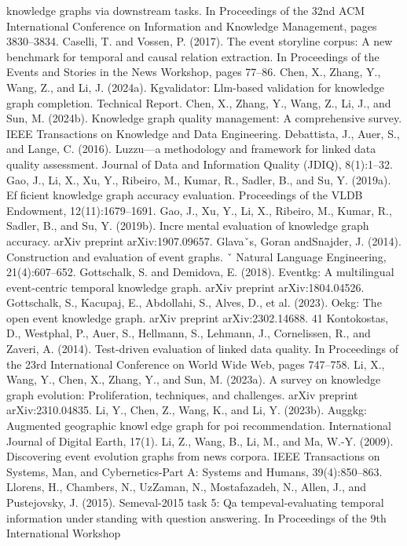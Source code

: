 knowledge graphs via downstream tasks. In Proceedings of the 32nd ACM International
Conference on Information and Knowledge Management, pages 3830–3834.
Caselli, T. and Vossen, P. (2017). The event storyline corpus: A new benchmark for
temporal and causal relation extraction. In Proceedings of the Events and Stories in
the News Workshop, pages 77–86.
Chen, X., Zhang, Y., Wang, Z., and Li, J. (2024a). Kgvalidator: Llm-based validation
for knowledge graph completion. Technical Report.
Chen, X., Zhang, Y., Wang, Z., Li, J., and Sun, M. (2024b). Knowledge graph quality
management: A comprehensive survey. IEEE Transactions on Knowledge and Data
Engineering.
Debattista, J., Auer, S., and Lange, C. (2016). Luzzu—a methodology and framework
for linked data quality assessment. Journal of Data and Information Quality (JDIQ),
8(1):1–32.
Gao, J., Li, X., Xu, Y., Ribeiro, M., Kumar, R., Sadler, B., and Su, Y. (2019a). Efficient knowledge graph accuracy evaluation. Proceedings of the VLDB Endowment,
12(11):1679–1691.
Gao, J., Xu, Y., Li, X., Ribeiro, M., Kumar, R., Sadler, B., and Su, Y. (2019b). Incremental evaluation of knowledge graph accuracy. arXiv preprint arXiv:1907.09657.
Glavaˇs, Goran andSnajder, J. (2014). Construction and evaluation of event graphs. ˇ
Natural Language Engineering, 21(4):607–652.
Gottschalk, S. and Demidova, E. (2018). Eventkg: A multilingual event-centric temporal
knowledge graph. arXiv preprint arXiv:1804.04526.
Gottschalk, S., Kacupaj, E., Abdollahi, S., Alves, D., et al. (2023). Oekg: The open
event knowledge graph. arXiv preprint arXiv:2302.14688.
41
Kontokostas, D., Westphal, P., Auer, S., Hellmann, S., Lehmann, J., Cornelissen, R., and
Zaveri, A. (2014). Test-driven evaluation of linked data quality. In Proceedings of the
23rd International Conference on World Wide Web, pages 747–758.
Li, X., Wang, Y., Chen, X., Zhang, Y., and Sun, M. (2023a). A survey on knowledge graph
evolution: Proliferation, techniques, and challenges. arXiv preprint arXiv:2310.04835.
Li, Y., Chen, Z., Wang, K., and Li, Y. (2023b). Auggkg: Augmented geographic knowledge graph for poi recommendation. International Journal of Digital Earth, 17(1).
Li, Z., Wang, B., Li, M., and Ma, W.-Y. (2009). Discovering event evolution graphs from
news corpora. IEEE Transactions on Systems, Man, and Cybernetics-Part A: Systems
and Humans, 39(4):850–863.
Llorens, H., Chambers, N., UzZaman, N., Mostafazadeh, N., Allen, J., and Pustejovsky,
J. (2015). Semeval-2015 task 5: Qa tempeval-evaluating temporal information understanding with question answering. In Proceedings of the 9th International Workshop
